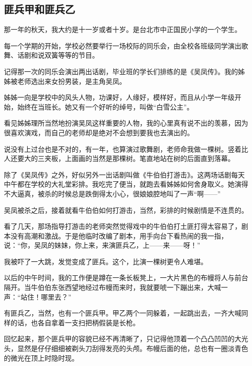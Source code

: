 \subsection{匪兵甲和匪兵乙}


\par 那一年的秋天，我大约是十一岁或者十岁。是台北市中正国民小学的一个学生。
\par 每一个学期的开始，学校必然要举行一场校际的同乐会，由全校各班级同学演出歌舞、话剧和说双簧等等的节目。
\par 记得那一次的同乐会演出两出话剧，毕业班的学长们排练的是《吴凤传》。我的姊姊被老师选出来女扮男装，是主角吴凤。
\par 姊姊一向是学校中的风头人物，功课好，人缘好，模样好，而且从小学一年级开始，始终在当班长。她又有一个好听的绰号，叫做“白雪公主”。
\par 看见姊姊理所当然地扮演吴凤这样重要的人物，我的心里真有说不出的羡慕，因为很喜欢演戏，而自己的老师却是绝对不会想到要我也去演出的。
\par 说没有上过台也是不对的，有一年，也算演过歌舞剧，老师命我做一棵树。竖着比人还要大的三夹板，上面画的当然是那棵树。笔直地站在树的后面直到落幕。
\par 除了《吴凤传》之外，好似另外一出话剧叫做《牛伯伯打游击》。这两场话剧每天中午都在学校的大礼堂彩排。我吃完了便当，就跑去看姊姊如何舍身取义。她演得不大逼真，被杀的时候总是跌倒得太小心，很娘娘腔地叫了一声“啊——”
\par 吴凤被杀之后，接着就看牛伯伯如何打游击，当然，彩排的时候剧情是不连贯的。
\par 看了几天，那场指导打游击的老师突然觉得戏中的牛伯伯打土匪打得太容易了，剧本没有高潮和激战。于是他临时改编了剧本，用手向台下看热闹的我一指，说：“你，吴凤的妹妹，你上来，来演匪兵乙，上——来——呀！”
\par 我被吓了一大跳，发觉变成了匪兵。这个，比演一棵树更令人难堪。
\par 以后的中午时间，我的工作便是蹲在一条长板凳上，一大片黑色的布幔将人与前台隔开。当牛伯伯东张西望地经过布幔而来时，我就要唬一下蹦出来，大喊一声：“站住！哪里去？”
\par 有匪兵乙，当然，也有一个匪兵甲。甲乙两个一同躲着，一起跳出去，一齐大喊同样的话，也各自拿着一支扫把柄假装是长枪。
\par 回忆起来，那个匪兵甲的容貌已经不再清晰了，只记得他顶着一个凸凸凹凹的大光头，显然是仔仔细细被剃头刀刮得发亮的头颅。布幔后面的他，总也有一圈淡青色的微光在顶上时隐时现。
